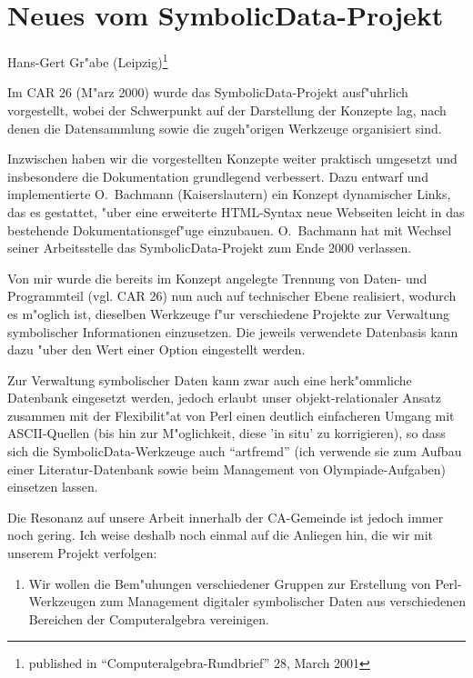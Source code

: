 \documentclass{article}
\newcommand{\SD}{{\sc Symbolic\-Data}}
\begin{document}
\section*{\centering Neues vom \SD-Projekt}

\begin{center} 
Hans-Gert Gr"abe (Leipzig)\footnote{published in
``Computeralgebra-Rundbrief'' 28, March 2001}
\end{center}

Im CAR 26 (M"arz 2000) wurde das \SD-Projekt ausf"uhrlich vorgestellt,
wobei der Schwerpunkt auf der Darstellung der Konzepte lag, nach denen
die Datensammlung sowie die zugeh"origen Werkzeuge organisiert sind.

Inzwischen haben wir die vorgestellten Konzepte weiter praktisch
umgesetzt und insbesondere die Dokumentation grundlegend verbessert.
Dazu entwarf und implementierte O.~Bachmann (Kaiserslautern) ein
Konzept dynamischer Links, das es gestattet, "uber eine erweiterte
HTML-Syntax neue Webseiten leicht in das bestehende
Dokumentationsgef"uge einzubauen.  O.~Bachmann hat mit Wechsel seiner
Arbeitsstelle das \SD-Projekt zum Ende 2000 verlassen.

Von mir wurde die bereits im Konzept angelegte Trennung von Daten- und
Programmteil (vgl. CAR 26) nun auch auf technischer Ebene realisiert,
wodurch es m"oglich ist, dieselben Werkzeuge f"ur verschiedene Projekte
zur Verwaltung symbolischer Informationen einzusetzen. Die jeweils
verwendete Datenbasis kann dazu "uber den Wert einer Option eingestellt
werden.  

Zur Verwaltung symbolischer Daten kann zwar auch eine herk"ommliche
Datenbank eingesetzt werden, jedoch erlaubt unser objekt-relationaler
Ansatz zusammen mit der Flexibilit"at von Perl einen deutlich
einfacheren Umgang mit ASCII-Quellen (bis hin zur M"oglichkeit, diese
'in situ' zu korrigieren), so dass sich die \SD-Werkzeuge auch
``artfremd'' (ich verwende sie zum Aufbau einer Literatur-Datenbank
sowie beim Management von Olympiade-Aufgaben) einsetzen lassen.
\medskip

Die Resonanz auf unsere Arbeit innerhalb der CA-Gemeinde ist jedoch
immer noch gering.  Ich weise deshalb noch einmal auf die Anliegen
hin, die wir mit unserem Projekt verfolgen: 
\begin{enumerate}
\item[1.] Wir wollen die Bem"uhungen verschiedener Gruppen zur
Erstellung von Perl-Werkzeugen zum Management digitaler symbolischer
Daten aus verschiedenen Bereichen der Computeralgebra vereinigen.
\end{enumerate}
\end{document}
